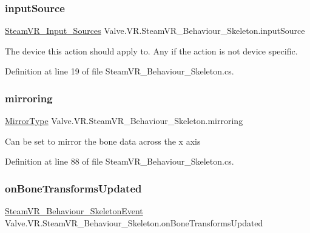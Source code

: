 \subsubsection{\texorpdfstring{inputSource}{inputSource}}
{\footnotesize\ttfamily \mbox{\hyperlink{namespace_valve_1_1_v_r_a82e5bf501cc3aa155444ee3f0662853f}{Steam\+V\+R\+\_\+\+Input\+\_\+\+Sources}} Valve.\+V\+R.\+Steam\+V\+R\+\_\+\+Behaviour\+\_\+\+Skeleton.\+input\+Source}



The device this action should apply to. Any if the action is not device specific. 



Definition at line 19 of file Steam\+V\+R\+\_\+\+Behaviour\+\_\+\+Skeleton.\+cs.

\mbox{\label{class_valve_1_1_v_r_1_1_steam_v_r___behaviour___skeleton_a1d28330bba50a010abd1deac97920b12}} 
\subsubsection{\texorpdfstring{mirroring}{mirroring}}
{\footnotesize\ttfamily \mbox{\hyperlink{class_valve_1_1_v_r_1_1_steam_v_r___behaviour___skeleton_a3188d8ae0638290912932d7ae16b4a02}{Mirror\+Type}} Valve.\+V\+R.\+Steam\+V\+R\+\_\+\+Behaviour\+\_\+\+Skeleton.\+mirroring}



Can be set to mirror the bone data across the x axis 



Definition at line 88 of file Steam\+V\+R\+\_\+\+Behaviour\+\_\+\+Skeleton.\+cs.

\mbox{\label{class_valve_1_1_v_r_1_1_steam_v_r___behaviour___skeleton_a32ca64f78a462086d338e9d3bc8d6464}} 
\subsubsection{\texorpdfstring{onBoneTransformsUpdated}{onBoneTransformsUpdated}}
{\footnotesize\ttfamily \mbox{\hyperlink{class_valve_1_1_v_r_1_1_steam_v_r___behaviour___skeleton_event}{Steam\+V\+R\+\_\+\+Behaviour\+\_\+\+Skeleton\+Event}} Valve.\+V\+R.\+Steam\+V\+R\+\_\+\+Behaviour\+\_\+\+Skeleton.\+on\+Bone\+Transforms\+Updated}



